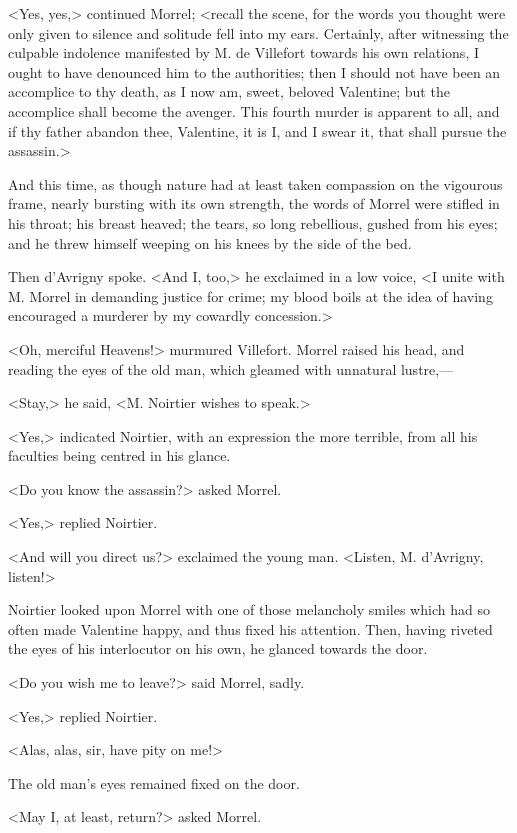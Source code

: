  <Yes, yes,> continued Morrel; <recall the scene, for the words you thought were only given to silence and solitude fell into my ears. Certainly, after witnessing the culpable indolence manifested by M. de Villefort towards his own relations, I ought to have denounced him to the authorities; then I should not have been an accomplice to thy death, as I now am, sweet, beloved Valentine; but the accomplice shall become the avenger. This fourth murder is apparent to all, and if thy father abandon thee, Valentine, it is I, and I swear it, that shall pursue the assassin.> 

 And this time, as though nature had at least taken compassion on the vigourous frame, nearly bursting with its own strength, the words of Morrel were stifled in his throat; his breast heaved; the tears, so long rebellious, gushed from his eyes; and he threw himself weeping on his knees by the side of the bed. 

 Then d'Avrigny spoke. <And I, too,> he exclaimed in a low voice, <I unite with M. Morrel in demanding justice for crime; my blood boils at the idea of having encouraged a murderer by my cowardly concession.> 

 <Oh, merciful Heavens!> murmured Villefort. Morrel raised his head, and reading the eyes of the old man, which gleamed with unnatural lustre,— 

 <Stay,> he said, <M. Noirtier wishes to speak.> 

 <Yes,> indicated Noirtier, with an expression the more terrible, from all his faculties being centred in his glance. 

 <Do you know the assassin?> asked Morrel. 

 <Yes,> replied Noirtier. 

 <And will you direct us?> exclaimed the young man. <Listen, M. d'Avrigny, listen!> 

 Noirtier looked upon Morrel with one of those melancholy smiles which had so often made Valentine happy, and thus fixed his attention. Then, having riveted the eyes of his interlocutor on his own, he glanced towards the door. 

 <Do you wish me to leave?> said Morrel, sadly. 

 <Yes,> replied Noirtier. 

 <Alas, alas, sir, have pity on me!> 

 The old man's eyes remained fixed on the door. 

 <May I, at least, return?> asked Morrel. 

